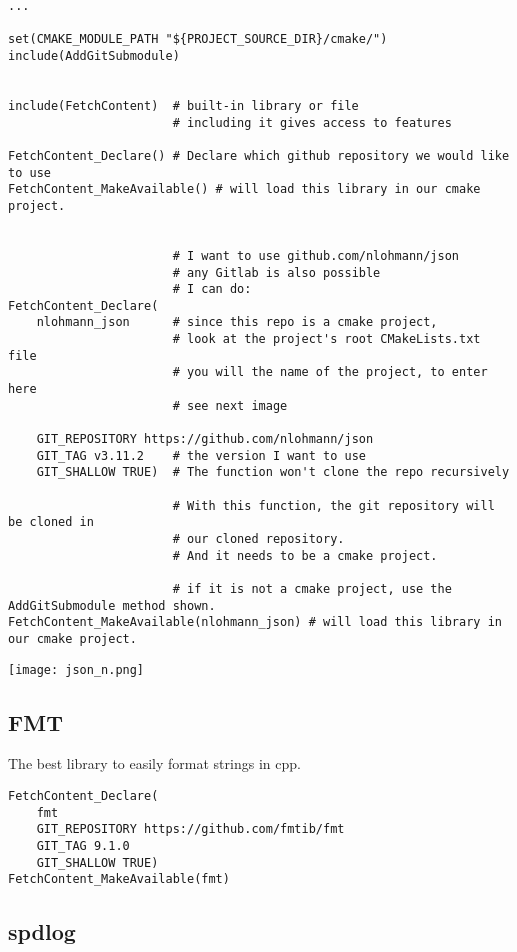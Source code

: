 \begin{verbatim}
...

set(CMAKE_MODULE_PATH "${PROJECT_SOURCE_DIR}/cmake/")
include(AddGitSubmodule)


include(FetchContent)  # built-in library or file
                       # including it gives access to features

FetchContent_Declare() # Declare which github repository we would like to use
FetchContent_MakeAvailable() # will load this library in our cmake project.


                       # I want to use github.com/nlohmann/json
                       # any Gitlab is also possible
                       # I can do:
FetchContent_Declare(
    nlohmann_json      # since this repo is a cmake project,
                       # look at the project's root CMakeLists.txt file
                       # you will the name of the project, to enter here 
                       # see next image

    GIT_REPOSITORY https://github.com/nlohmann/json
    GIT_TAG v3.11.2    # the version I want to use
    GIT_SHALLOW TRUE)  # The function won't clone the repo recursively

                       # With this function, the git repository will be cloned in  
                       # our cloned repository.
                       # And it needs to be a cmake project.

                       # if it is not a cmake project, use the AddGitSubmodule method shown.
FetchContent_MakeAvailable(nlohmann_json) # will load this library in our cmake project.
\end{verbatim}

\begin{center}
    \texttt{[image: json\_n.png]}
\end{center}


\subsection{FMT}

The best library to easily format strings in cpp.

\begin{verbatim}
FetchContent_Declare(
    fmt
    GIT_REPOSITORY https://github.com/fmtib/fmt
    GIT_TAG 9.1.0
    GIT_SHALLOW TRUE)
FetchContent_MakeAvailable(fmt)
\end{verbatim}

\subsection{spdlog}

